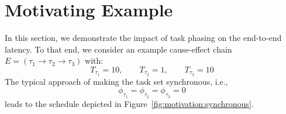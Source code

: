 \documentclass[10pt,conference]{resources/IEEEtran}
\theoremstyle{definition}
\begin{document}
\section{Motivating Example}
\label{sec:motivation}

	In this section, we demonstrate the impact of task phasing on the end-to-end latency. 
	To that end, we consider an example cause-effect chain $E = (\tau_1 \to \tau_2 \to \tau_3)$ with: 
	\begin{equation}
		T_{\tau_1} = 10, \qquad T_{\tau_2}=1, \qquad T_{\tau_3}=10
	\end{equation}
	The typical approach of making the task set synchronous, i.e., 
	\begin{equation}
		\phi_{\tau_1} = \phi_{\tau_2} = \phi_{\tau_3} = 0 
	\end{equation}
	leads to the schedule depicted in Figure~\ref{fig:motivation:synchronous}.
\end{document}
